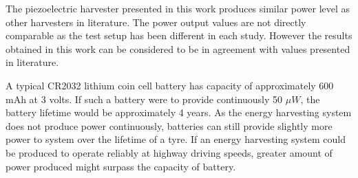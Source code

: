 The piezoelectric harvester presented in this work produces similar power level as other harvesters in literature. The power output values are not directly comparable as the test setup has been different in each study. However the results obtained in this work can be considered to be in agreement with values presented in literature. 

A typical CR2032 lithium coin cell battery has capacity of approximately 600 mAh at 3 volts. If such a battery were to provide continuously 50 $\mu W$, the battery lifetime would be approximately 4 years. As the energy harvesting system does not produce power continuously, batteries can still provide slightly more power to system over the lifetime of a tyre. If an energy harvesting system could be produced to operate reliably at highway driving speeds, greater amount of power produced might surpass the capacity of battery.
